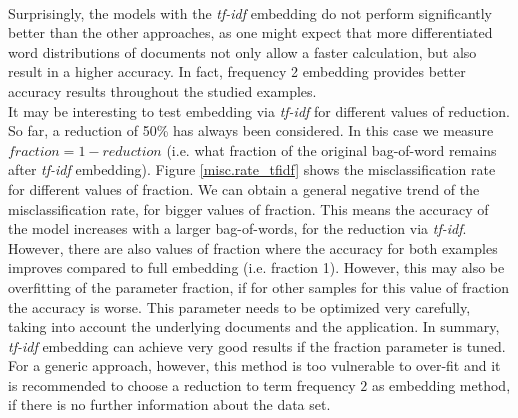 \documentclass[11pt,a4paper]{article}
\begin{document}
\ \\
Surprisingly, the models with the \textit{tf-idf} embedding do not perform significantly better than the other approaches, as one might expect that more differentiated word distributions of documents not only allow a faster calculation, but also result in a higher accuracy. In fact, frequency 2 embedding provides better accuracy results throughout the studied examples.\\
It may be interesting to test embedding via \textit{tf-idf} for different values of reduction. So far, a reduction of 50\% has always been considered. In this case we measure $\textit{fraction}=1-\textit{reduction}$ (i.e. what fraction of the original bag-of-word remains after \textit{tf-idf} embedding). Figure \ref{misc.rate_tfidf} shows the misclassification rate for different values of fraction. We can obtain a general negative trend of the misclassification rate, for bigger values of fraction. This means the accuracy of the model increases with a larger bag-of-words, for the reduction via \textit{tf-idf}. However, there are also values of fraction where the accuracy for both examples improves compared to full embedding (i.e. fraction 1). However, this may also be overfitting of the parameter fraction, if for other samples for this value of fraction the accuracy is worse. This parameter needs to be optimized very carefully, taking into account the underlying documents and the application. In summary, \textit{tf-idf} embedding can achieve very good results if the fraction parameter is tuned. For a generic approach, however, this method is too vulnerable to over-fit and it is recommended to choose a reduction to term frequency $2$ as embedding method, if there is no further information about the data set.\\
\end{document}

